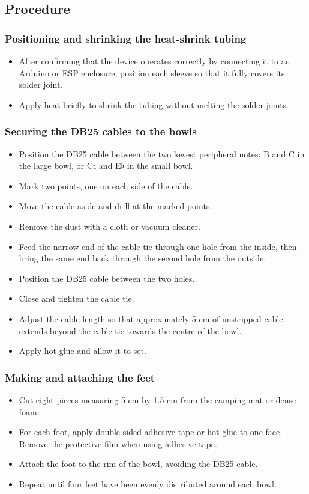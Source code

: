 \documentclass[11pt,a4paper]{article}
\newcommand{\procedure}{\subsection{Procedure}}
\begin{document}
\procedure
\subsubsection{Positioning and shrinking the heat-shrink tubing}
\begin{itemize}
  \item After confirming that the device operates correctly by connecting it to an Arduino or ESP enclosure, position each sleeve so that it fully covers its solder joint.
  \item Apply heat briefly to shrink the tubing without melting the solder joints.
\end{itemize}

\subsubsection{Securing the DB25 cables to the bowls}
\begin{itemize}
  \item Position the DB25 cable between the two lowest peripheral notes: B and C in the large bowl, or C$\sharp$ and E$\flat$ in the small bowl.
  \item Mark two points, one on each side of the cable.
  \item Move the cable aside and drill at the marked points.
  \item Remove the dust with a cloth or vacuum cleaner.
  \item Feed the narrow end of the cable tie through one hole from the inside, then bring the same end back through the second hole from the outside.
  \item Position the DB25 cable between the two holes.
  \item Close and tighten the cable tie.
  \item Adjust the cable length so that approximately 5 cm of unstripped cable extends beyond the cable tie towards the centre of the bowl.
  \item Apply hot glue and allow it to set.
\end{itemize}

\subsubsection{Making and attaching the feet}
\begin{itemize}
  \item Cut eight pieces measuring 5 cm by 1.5 cm from the camping mat or dense foam.
  \item For each foot, apply double-sided adhesive tape or hot glue to one face. Remove the protective film when using adhesive tape.
  \item Attach the foot to the rim of the bowl, avoiding the DB25 cable.
  \item Repeat until four feet have been evenly distributed around each bowl.
\end{itemize}
\end{document}
